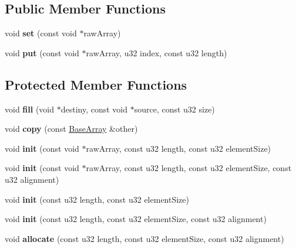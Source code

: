 \subsection*{Public Member Functions}
\begin{DoxyCompactItemize}
\item 
void {\bfseries set} (const void $\ast$raw\+Array)\hypertarget{classDE_1_1BaseArray_ac34bf7fbd622389f7f720f732eabd7be}{}\label{classDE_1_1BaseArray_ac34bf7fbd622389f7f720f732eabd7be}

\item 
void {\bfseries put} (const void $\ast$raw\+Array, u32 index, const u32 length)\hypertarget{classDE_1_1BaseArray_a6819ba88924727ef2e1a0a64873cf599}{}\label{classDE_1_1BaseArray_a6819ba88924727ef2e1a0a64873cf599}

\end{DoxyCompactItemize}
\subsection*{Protected Member Functions}
\begin{DoxyCompactItemize}
\item 
void {\bfseries fill} (void $\ast$destiny, const void $\ast$source, const u32 size)\hypertarget{classDE_1_1BaseArray_adb615f1ac1649d3aebe7cd12f8d976b7}{}\label{classDE_1_1BaseArray_adb615f1ac1649d3aebe7cd12f8d976b7}

\item 
void {\bfseries copy} (const \hyperlink{classDE_1_1BaseArray}{Base\+Array} \&other)\hypertarget{classDE_1_1BaseArray_ab8c75b509b9f9e5f86a9bd9f07f176d3}{}\label{classDE_1_1BaseArray_ab8c75b509b9f9e5f86a9bd9f07f176d3}

\item 
void {\bfseries init} (const void $\ast$raw\+Array, const u32 length, const u32 element\+Size)\hypertarget{classDE_1_1BaseArray_a32dc53db3907bb3f7e5f7f3f996afbf7}{}\label{classDE_1_1BaseArray_a32dc53db3907bb3f7e5f7f3f996afbf7}

\item 
void {\bfseries init} (const void $\ast$raw\+Array, const u32 length, const u32 element\+Size, const u32 alignment)\hypertarget{classDE_1_1BaseArray_a2f740017dbe773fb2f60a02056b5e626}{}\label{classDE_1_1BaseArray_a2f740017dbe773fb2f60a02056b5e626}

\item 
void {\bfseries init} (const u32 length, const u32 element\+Size)\hypertarget{classDE_1_1BaseArray_aa7f414f5ae60f232b764aa4247aaf98b}{}\label{classDE_1_1BaseArray_aa7f414f5ae60f232b764aa4247aaf98b}

\item 
void {\bfseries init} (const u32 length, const u32 element\+Size, const u32 alignment)\hypertarget{classDE_1_1BaseArray_a1c10298935a5ce71e3f931c99d5876a6}{}\label{classDE_1_1BaseArray_a1c10298935a5ce71e3f931c99d5876a6}

\item 
void {\bfseries allocate} (const u32 length, const u32 element\+Size, const u32 alignment)\hypertarget{classDE_1_1BaseArray_a6b028c5a060abb529fea6c06502f8768}{}\label{classDE_1_1BaseArray_a6b028c5a060abb529fea6c06502f8768}

\end{DoxyCompactItemize}
